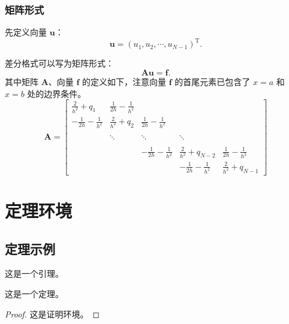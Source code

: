 \documentclass{shnuthesis}
\begin{document}
\subsection{矩阵形式}

先定义向量 $\boldsymbol{u}$：
\begin{equation*}
  \boldsymbol{u}=(u_{1}, u_{2}, \cdots, u_{N-1})^{\mathrm{T}}.
\end{equation*}

差分格式可以写为矩阵形式：
\begin{equation*}
  \boldsymbol{A}\boldsymbol{u}=\boldsymbol{f}.
\end{equation*}
其中矩阵 $\boldsymbol{A}$、向量 $\boldsymbol{f}$ 的定义如下，注意向量 $\boldsymbol{f}$ 的首尾元素已包含了 $x=a$ 和 $x=b$ 处的边界条件。
\begin{equation}\label{equ:matrix}
\boldsymbol{A}=\left[\begin{array}{cccccc}
\displaystyle \frac{2}{h^{2}}+q_{1} & \displaystyle\frac{1}{2h}-\frac{1}{h^{2}} &   &  &  \\[8pt]
 \displaystyle-\frac{1}{2h}-\frac{1}{h^{2}} & \displaystyle \frac{2}{h^{2}}+q_{2} & \displaystyle\frac{1}{2h}-\frac{1}{h^{2}}  & &  \\[8pt]
  &  &  &  &    \\
   &  \ddots  & \ddots  &   \ddots  &    \\[8pt]
   &  &  &  &    \\
  &   & \displaystyle-\frac{1}{2h}-\frac{1}{h^{2}} & \displaystyle\frac{2}{h^{2}}+q_{N-2}& \displaystyle\frac{1}{2h}-\frac{1}{h^{2}} \\[8pt]
  &  &  & \displaystyle-\frac{1}{2h}-\frac{1}{h^{2}} & \displaystyle \frac{2}{h^{2}}+q_{N-1}
\end{array}\right]
\end{equation}




\chapter{定理环境}

\section{定理示例}

\begin{lemma}[Lemma]
这是一个引理。
\end{lemma}


\begin{theorem}[Theorem]
这是一个定理。
\end{theorem}
\begin{proof}
这是证明环境。
\end{proof}
\end{document}
